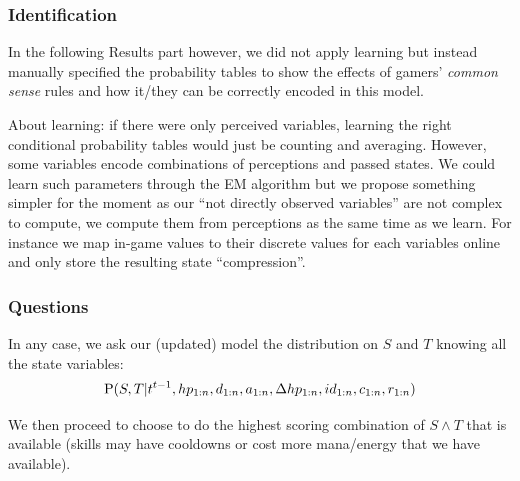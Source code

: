 \subsubsection{Identification}

In the following Results part however, we did not apply learning but instead manually specified the probability tables to show the effects of gamers' \textit{common sense} rules and how it/they can be correctly encoded in this model.

About learning: if there were only perceived variables, learning the right conditional probability tables would just be counting and averaging. However, some variables encode combinations of perceptions and passed states. We could learn such parameters through the EM algorithm but we propose something simpler for the moment as our ``not directly observed variables'' are not complex to compute, we compute them from perceptions as the same time as we learn. For instance we map in-game values to their discrete values for each variables online and only store the resulting state ``compression''. 

\subsubsection{Questions}

In any case, we ask our (updated) model the distribution on $S$ and $T$ knowing all the state variables:\\
\begin{equation}
\mathrm{P}(S,T|t^{t-1},hp_{1:n},d_{1:n}, a_{1:n}, \Delta hp_{1:n}, id_{1:n}, c_{1:n}, r_{1:n})
\end{equation}

We then proceed to choose to do the highest scoring combination of $S \wedge T$ that is available (skills may have cooldowns or cost more mana/energy that we have available).

